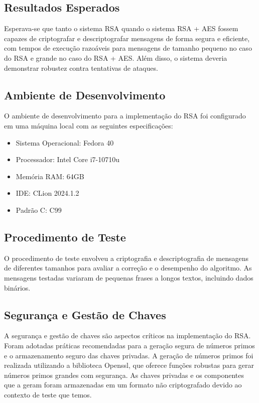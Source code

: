 \documentclass[a4paper,12pt]{article}
\begin{document}
\subsection*{Resultados Esperados}
Esperava-se que tanto o sistema RSA quando o sistema RSA + AES fossem capazes de criptografar e descriptografar mensagens de forma segura e eficiente, com tempos de execução razoáveis para mensagens de tamanho pequeno no caso do RSA e grande no caso do RSA + AES. Além disso, o sistema deveria demonstrar robustez contra tentativas de ataques.

\subsection*{Ambiente de Desenvolvimento}
O ambiente de desenvolvimento para a implementação do RSA foi configurado em uma máquina local com as seguintes especificações:
\begin{itemize}
    \item Sistema Operacional: Fedora 40
    \item Processador: Intel Core i7-10710u
    \item Memória RAM: 64GB
    \item IDE: CLion 2024.1.2
    \item Padrão C: C99
\end{itemize}

\subsection*{Procedimento de Teste}
O procedimento de teste envolveu a criptografia e descriptografia de mensagens de diferentes tamanhos para avaliar a correção e o desempenho do algoritmo. As mensagens testadas variaram de pequenas frases a longos textos, incluindo dados binários.

\subsection*{Segurança e Gestão de Chaves}
A segurança e gestão de chaves são aspectos críticos na implementação do RSA. Foram adotadas práticas recomendadas para a geração segura de números primos e o armazenamento seguro das chaves privadas. A geração de números primos foi realizada utilizando a biblioteca Openssl, que oferece funções robustas para gerar números primos grandes com segurança. As chaves privadas e os componentes que a geram foram armazenadas em um formato não criptografado devido ao contexto de teste que temos.
\end{document}
